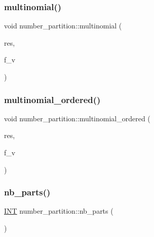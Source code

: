 \mbox{\label{classnumber__partition_a62b34cba15a09ecc469517a9aa7d936d}} 
\subsubsection{\texorpdfstring{multinomial()}{multinomial()}}
{\footnotesize\ttfamily void number\+\_\+partition\+::multinomial (\begin{DoxyParamCaption}\item[{\mbox{\hyperlink{classdiscreta__base}{discreta\+\_\+base}} \&}]{res,  }\item[{\mbox{\hyperlink{galois_8h_a09fddde158a3a20bd2dcadb609de11dc}{I\+NT}}}]{f\+\_\+v }\end{DoxyParamCaption})}

\mbox{\label{classnumber__partition_a0d92a28d0d047c698d1c1c8fb93a6608}} 
\subsubsection{\texorpdfstring{multinomial\+\_\+ordered()}{multinomial\_ordered()}}
{\footnotesize\ttfamily void number\+\_\+partition\+::multinomial\+\_\+ordered (\begin{DoxyParamCaption}\item[{\mbox{\hyperlink{classdiscreta__base}{discreta\+\_\+base}} \&}]{res,  }\item[{\mbox{\hyperlink{galois_8h_a09fddde158a3a20bd2dcadb609de11dc}{I\+NT}}}]{f\+\_\+v }\end{DoxyParamCaption})}

\mbox{\label{classnumber__partition_ac9fc2a34e6e5a93fb7f28e30906db51b}} 
\subsubsection{\texorpdfstring{nb\+\_\+parts()}{nb\_parts()}}
{\footnotesize\ttfamily \mbox{\hyperlink{galois_8h_a09fddde158a3a20bd2dcadb609de11dc}{I\+NT}} number\+\_\+partition\+::nb\+\_\+parts (\begin{DoxyParamCaption}{ }\end{DoxyParamCaption})}

